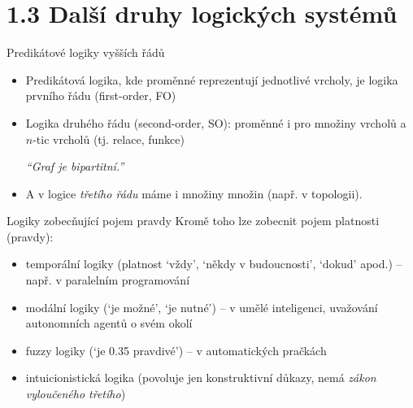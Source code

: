\documentclass{beamer}
\begin{document}
\section{1.3 Další druhy logických systémů}


\begin{frame}{Predikátové logiky vyšších řádů}

    \begin{itemize}
        \item Predikátová logika, kde proměnné reprezentují jednotlivé vrcholy, je logika \alert{prvního řádu} (\alert{first-order}, \alert{FO})
        \item Logika \alert{druhého řádu} (\alert{second-order}, \alert{SO}): proměnné i pro množiny vrcholů a $n$-tic vrcholů (tj. relace, funkce)
        \bigskip

        \begin{center}
            \it ``Graf je bipartitní.''
        \end{center}  

        \medskip
        \item A v logice \emph{třetího řádu} máme i množiny množin (např. v topologii).
    \end{itemize}

\end{frame}


\begin{frame}{Logiky zobecňující pojem pravdy}
    Kromě toho lze zobecnit pojem platnosti (pravdy):
    
    \begin{itemize}        
        \item \alert{temporální logiky} (platnost `vždy', `někdy v budoucnosti', `dokud' apod.) -- např. v paralelním programování
        \item \alert{modální logiky} (`je možné', `je nutné') -- v umělé inteligenci, uvažování autonomních agentů o svém okolí
        \item \alert{fuzzy logiky} (`je 0.35 pravdivé') -- v automatických pračkách
        \item \alert{intuicionistická logika} (povoluje jen konstruktivní důkazy, nemá \emph{zákon vyloučeného třetího})
    \end{itemize}
\end{frame}
\end{document}
